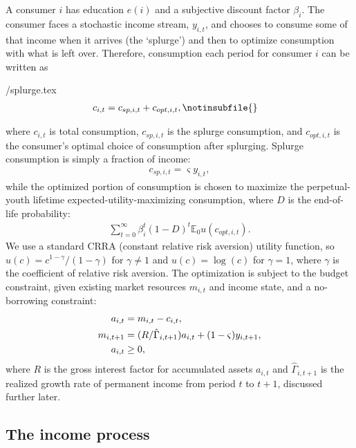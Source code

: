 \documentclass[\econtexRoot/EGMN]{subfiles}
\begin{document}
A consumer $i$ has education $e(i)$ and a subjective discount factor $\beta_i$. The consumer faces a stochastic income stream, $y_{i,t}$, and chooses to consume some of that income when it arrives (the `splurge') and then to optimize consumption with what is left over. Therefore, consumption each period for consumer $i$ can be written as
\begin{verbatimwrite}{\EqDir/splurge.tex}
    \begin{align}
        c_{i,t} & = c_{sp,i,t} + c_{opt,i,t}, \notinsubfile{\label{sec:model}}
    \end{align}
\end{verbatimwrite}

where $c_{i,t}$ is total consumption, $c_{sp,i,t}$ is the splurge consumption, and $c_{opt,i,t}$ is the consumer's optimal choice of consumption after splurging. Splurge consumption is simply a fraction of income:
\begin{align}
    c_{sp,i,t} = \varsigma y_{i,t},
\end{align}
while the optimized portion of consumption is chosen to maximize the perpetual-youth lifetime expected-utility-maximizing consumption, where $D$ is the end-of-life probability:
\begin{align}
    \sum_{t=0}^{\infty}\beta_i^t (1-D)^t \mathbb{E}_0 u(c_{opt,i,t}).
\end{align}
We use a standard CRRA (constant relative risk aversion) utility function, so $u(c) = c^{1-\gamma}/(1-\gamma)$ for $\gamma \neq 1$ and $u(c) = \log(c)$ for $\gamma=1$, where $\gamma$ is the coefficient of relative risk aversion. The optimization is subject to the budget constraint, given existing market resources $m_{i,t}$ and income state, and a no-borrowing constraint:
\begin{align}
    a_{i,t}   & = m_{i,t} - c_{i,t}, \notag                                   \\
    m_{i,t+1} & = (R/\hat{\Gamma}_{i,t+1}) a_{i,t} + (1-\varsigma) y_{i,t+1}, \\
    a_{i,t}   & \geq 0,   \notag
\end{align}
where $R$ is the gross interest factor for accumulated assets $a_{i,t}$ and $\hat{\Gamma}_{i,t+1}$ is the realized growth rate of permanent income from period $t$ to $t+1$, discussed further later.

\hypertarget{the-income-process}{}\par\subsection{The income process}
\end{document}
